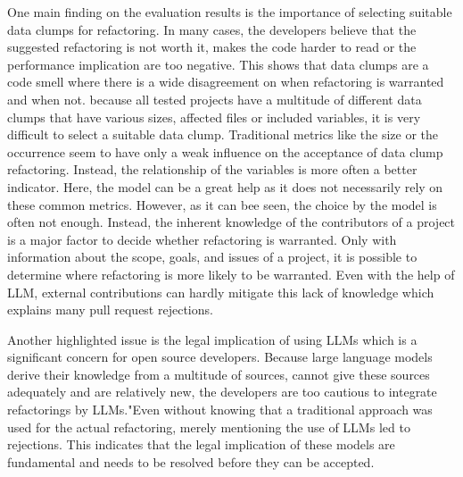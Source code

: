 One main finding on the evaluation results is the importance of selecting suitable data clumps for refactoring. In many cases, the developers believe that the suggested refactoring is not worth it, makes the code harder to read or the performance implication are too negative. This shows that data clumps are a code smell where there is a wide disagreement on when refactoring is warranted and when not. because all tested projects have a multitude of different data clumps that have various sizes, affected files or included variables, it is very difficult to select a suitable data clump. Traditional metrics like the size or the occurrence seem to have only a weak influence on the acceptance of data clump refactoring. Instead, the relationship of the variables is more often a better indicator. Here, the model can be a great help as it does not necessarily rely on these common metrics. However, as it can bee seen, the choice by the model is often not enough. Instead, the inherent knowledge of the contributors of a project is a major factor to decide whether refactoring is warranted. Only with information about the scope, goals, and issues of a project, it is possible to determine where refactoring is more likely to be warranted. Even with the help of \ac{LLM}, external contributions can hardly mitigate this lack of knowledge which explains many pull request rejections. 

Another highlighted issue is the legal implication of using \acp{LLM} which is a significant concern for open source developers. Because large language models derive their knowledge from a multitude of sources, cannot give these sources adequately and are relatively new, the developers are too cautious to integrate refactorings by \acp{LLM}."Even without knowing that a traditional approach was used for the actual refactoring, merely mentioning the use of LLMs led to rejections.  This indicates that the legal implication of these models are fundamental and needs to be resolved before they can be accepted. 